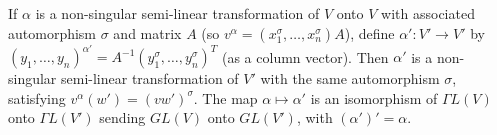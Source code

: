 If $\alpha$ is a non-singular semi-linear transformation of $V$ onto $V$ with associated automorphism $\sigma$ and matrix $A$ (so $v^\alpha = (x_1^\sigma, \dots, x_n^\sigma)A$), define $\alpha' : V' \to V'$ by $(y_1, \dots, y_n)^{\alpha'} = A^{-1}(y_1^\sigma, \dots, y_n^\sigma)^T$ (as a column vector). Then $\alpha'$ is a non-singular semi-linear transformation of $V'$ with the same automorphism $\sigma$, satisfying $v^\alpha(w') = (v w')^\sigma$. The map $\alpha \mapsto \alpha'$ is an isomorphism of $\Gamma L(V)$ onto $\Gamma L(V')$ sending $GL(V)$ onto $GL(V')$, with $(\alpha')' = \alpha$.
